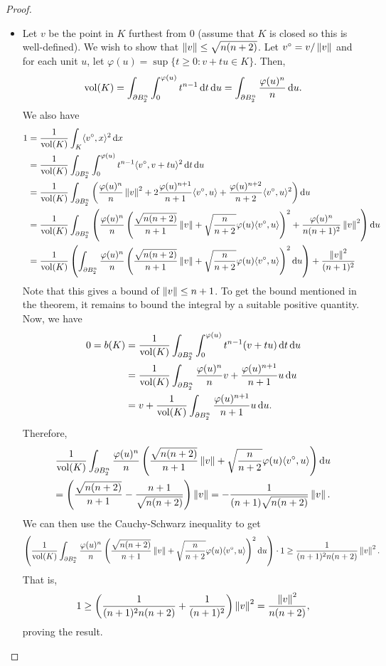 \begin{proof}
\begin{itemize}
		\item Let $v$ be the point in $K$ furthest from $0$ (assume that $K$ is closed so this is well-defined). We wish to show that $\left\lVert v\right\rVert\leq\sqrt{n(n+2)}$. Let $v^{\circ} = v/\left\lVert v\right\rVert$ and for each unit $u$, let $\varphi(u) = \sup\{t\geq 0 : v+tu\in K\}$. Then,
		\[ \operatorname{vol}(K) = \int_{\partial B_2^n} \int_{0}^{\varphi(u)} t^{n-1}\operatorname{d}\!{t}\operatorname{d}\!{u} = \int_{\partial B_2^n} \frac{\varphi(u)^n}{n} \operatorname{d}\!{u}. \]
		We also have
		\begin{align*}
			1 &= \frac{1}{\operatorname{vol}(K)} \int_K \langle v^\circ, x\rangle^2 \operatorname{d}\!{x} \\
			 &=  \frac{1}{\operatorname{vol}(K)} \int_{\partial B_2^n} \int_0^{\varphi(u)} t^{n-1} \langle v^\circ, v+tu\rangle^2 \operatorname{d}\!{t}\operatorname{d}\!{u} \\
			 &= \frac{1}{\operatorname{vol}(K)} \int_{\partial B_2^n} \left( \frac{\varphi(u)^n}{n}\left\lVert v\right\rVert^2 + 2\frac{\varphi(u)^{n+1}}{n+1} \langle v^\circ, u\rangle + \frac{\varphi(u)^{n+2}}{n+2} \langle v^\circ, u\rangle^2 \right) \operatorname{d}\!{u} \\
			 &= \frac{1}{\operatorname{vol}(K)} \int_{\partial B_2^n} \left( \frac{\varphi(u)^n}{n} \left(\frac{\sqrt{n(n+2)}}{n+1}\left\lVert v\right\rVert + \sqrt{\frac{n}{n+2}}\varphi(u) \langle v^\circ, u\rangle\right)^2 + \frac{\varphi(u)^n}{n(n+1)^2}\left\lVert v\right\rVert^2 \right) \operatorname{d}\!{u} \\
			 &= \frac{1}{\operatorname{vol}(K)} \left( \int_{\partial B_2^n} \frac{\varphi(u)^n}{n} \left(\frac{\sqrt{n(n+2)}}{n+1}\left\lVert v\right\rVert + \sqrt{\frac{n}{n+2}}\varphi(u)\langle v^\circ, u\rangle\right)^2 \operatorname{d}\!{u} \right) + \frac{\left\lVert v\right\rVert^2}{(n+1)^2}
		\end{align*}
		Note that this gives a bound of $\left\lVert v\right\rVert\leq n+1$. To get the bound mentioned in the theorem, it remains to bound the integral by a suitable positive quantity. Now, we have
		\begin{align*}
			0 = b(K) &= \frac{1}{\operatorname{vol}(K)} \int_{\partial B_2^n} \int_{0}^{\varphi(u)} t^{n-1} (v+tu) \operatorname{d}\!{t}\operatorname{d}\!{u} \\
			 &= \frac{1}{\operatorname{vol}(K)} \int_{\partial B_2^n} \frac{\varphi(u)^n}{n}v + \frac{\varphi(u)^{n+1}}{n+1}u \operatorname{d}\!{u} \\
			 &= v + \frac{1}{\operatorname{vol}(K)} \int_{\partial B_2^n} \frac{\varphi(u)^{n+1}}{n+1}u\operatorname{d}\!{u}.
		\end{align*}
		Therefore,
		\begin{multline*}
			\frac{1}{\operatorname{vol}(K)} \int_{\partial B_2^n} \frac{\varphi(u)^n}{n} \left(\frac{\sqrt{n(n+2)}}{n+1}\left\lVert v\right\rVert + \sqrt{\frac{n}{n+2}}\varphi(u) \langle v^\circ,u\rangle\right) \operatorname{d}\!{u} \\
			= \left(\frac{\sqrt{n(n+2)}}{n+1} - \frac{n+1}{\sqrt{n(n+2)}}\right)\left\lVert v\right\rVert = -\frac{1}{(n+1)\sqrt{n(n+2)}}\left\lVert v\right\rVert.
		\end{multline*}
		We can then use the Cauchy-Schwarz inequality to get
		\[ \left( \frac{1}{\operatorname{vol}(K)} \int_{\partial B_2^n} \frac{\varphi(u)^n}{n} \left(\frac{\sqrt{n(n+2)}}{n+1}\left\lVert v\right\rVert + \sqrt{\frac{n}{n+2}}\varphi(u)\langle v^\circ, u\rangle\right)^2 \operatorname{d}\!{u} \right) \cdot 1 \geq \frac{1}{(n+1)^2n(n+2)}\left\lVert v\right\rVert^2. \]
		That is,
		\[ 1 \geq \left(\frac{1}{(n+1)^2n(n+2)} + \frac{1}{(n+1)^2}\right)\left\lVert v\right\rVert^2 = \frac{\left\lVert v\right\rVert^2}{n(n+2)}, \]
		proving the result.
	\end{itemize}	
\end{proof}

